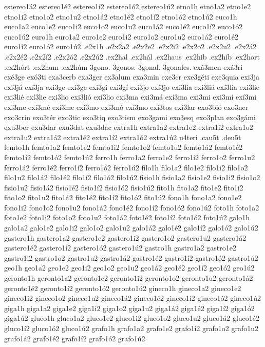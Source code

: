 {estereo1á2 estereo1é2 estereo1í2 estereo1ó2 estereo1ú2
etno1h
etno1a2 etno1e2 etno1i2 etno1o2 etno1u2
etno1á2 etno1é2 etno1í2 etno1ó2 etno1ú2
euco1h
euco1a2 euco1e2 euco1i2 euco1o2 euco1u2
euco1á2 euco1é2 euco1í2 euco1ó2 euco1ú2
euro1h
euro1a2 euro1e2 euro1i2 euro1o2 euro1u2
euro1á2 euro1é2 euro1í2 euro1ó2 euro1ú2
.e2x1h
.e2x2a2 .e2x2e2 .e2x2i2 .e2x2o2 .e2x2u2
.e2x2á2 .e2x2é2 .e2x2í2 .e2x2ó2 .e2x2ú2
.ex2hal
.ex2hál
.ex2haus
.ex2hib
.ex2híb
.ex2hort
.ex2hórt
.ex2hum
.ex2húm
3gono.
3gonos.
3gonal.
3gonales.
exá3men
exá3ri
exé3ge
exó3ti
exa3cerb
exa3ger
ex3alum
exa3min
exe3cr
exe3géti
exe3quia
exi3ja
exi3já
exí3ja
exi3ge
exí3ge
exi3gi
exi3gí
exi3jo
exí3jo
exi3lia
exi3liá
exí3lia
exi3lie
exi3lié
exí3lie
exi3lio
exi3lió
exí3lio
exi3ma
exi3má
exí3ma
exi3mi
exi3mí
exí3mi
exi3me
exi3mé
exí3me
exi3mo
exi3mó
exí3mo
exi3tos
exi3lar
exo3bió
exo3ner
exo3crin
exo3tér
exo3tic
exo3tiq
exo3tism
exo3gami
exo3esq
exo3plan
exo3gámi
exu3ber
exu3dar
exu3dat
exu3dac
extra1h
extra1a2 extra1e2 extra1i2 extra1o2 extra1u2
extra1á2 extra1é2 extra1í2 extra1ó2 extra1ú2
u4teri
.cau5t
.deu5t
femto1h
femto1a2 femto1e2 femto1i2 femto1o2 femto1u2
femto1á2 femto1é2 femto1í2 femto1ó2 femto1ú2
ferro1h
ferro1a2 ferro1e2 ferro1i2 ferro1o2 ferro1u2
ferro1á2 ferro1é2 ferro1í2 ferro1ó2 ferro1ú2
filo1h
filo1a2 filo1e2 filo1i2 filo1o2 filo1u2
filo1á2 filo1é2 filo1í2 filo1ó2 filo1ú2
fisio1h
fisio1a2 fisio1e2 fisio1i2 fisio1o2 fisio1u2
fisio1á2 fisio1é2 fisio1í2 fisio1ó2 fisio1ú2
fito1h
fito1a2 fito1e2 fito1i2 fito1o2 fito1u2
fito1á2 fito1é2 fito1í2 fito1ó2 fito1ú2
fono1h
fono1a2 fono1e2 fono1i2 fono1o2 fono1u2
fono1á2 fono1é2 fono1í2 fono1ó2 fono1ú2
foto1h
foto1a2 foto1e2 foto1i2 foto1o2 foto1u2
foto1á2 foto1é2 foto1í2 foto1ó2 foto1ú2
galo1h
galo1a2 galo1e2 galo1i2 galo1o2 galo1u2
galo1á2 galo1é2 galo1í2 galo1ó2 galo1ú2
gastero1h
gastero1a2 gastero1e2 gastero1i2 gastero1o2 gastero1u2
gastero1á2 gastero1é2 gastero1í2 gastero1ó2 gastero1ú2
gastro1h
gastro1a2 gastro1e2 gastro1i2 gastro1o2 gastro1u2
gastro1á2 gastro1é2 gastro1í2 gastro1ó2 gastro1ú2
geo1h
geo1a2 geo1e2 geo1i2 geo1o2 geo1u2
geo1á2 geo1é2 geo1í2 geo1ó2 geo1ú2
geronto1h
geronto1a2 geronto1e2 geronto1i2 geronto1o2 geronto1u2
geronto1á2 geronto1é2 geronto1í2 geronto1ó2 geronto1ú2
gineco1h
gineco1a2 gineco1e2 gineco1i2 gineco1o2 gineco1u2
gineco1á2 gineco1é2 gineco1í2 gineco1ó2 gineco1ú2
giga1h
giga1a2 giga1e2 giga1i2 giga1o2 giga1u2
giga1á2 giga1é2 giga1í2 giga1ó2 giga1ú2
gluco1h
gluco1a2 gluco1e2 gluco1i2 gluco1o2 gluco1u2
gluco1á2 gluco1é2 gluco1í2 gluco1ó2 gluco1ú2
grafo1h
grafo1a2 grafo1e2 grafo1i2 grafo1o2 grafo1u2
grafo1á2 grafo1é2 grafo1í2 grafo1ó2 grafo1ú2
}
